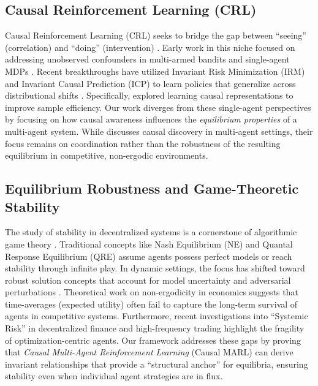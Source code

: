 \subsection{Causal Reinforcement Learning (CRL)}
Causal Reinforcement Learning (CRL) seeks to bridge the gap between ``seeing'' (correlation) and ``doing'' (intervention) \cite{bareinboim2023causal}. Early work in this niche focused on addressing unobserved confounders in multi-armed bandits and single-agent MDPs \cite{forney2017counterfactual, wang2021causal}. Recent breakthroughs have utilized Invariant Risk Minimization (IRM) \cite{arjovsky2019invariant} and Invariant Causal Prediction (ICP) \cite{peters2016causal} to learn policies that generalize across distributional shifts \cite{zhang2023invariant, lu2024robust}. Specifically, \cite{wang2023causal} explored learning causal representations to improve sample efficiency. Our work diverges from these single-agent perspectives by focusing on how causal awareness influences the \textit{equilibrium properties} of a multi-agent system. While \cite{sonntag2024causal} discusses causal discovery in multi-agent settings, their focus remains on coordination rather than the robustness of the resulting equilibrium in competitive, non-ergodic environments.

\subsection{Equilibrium Robustness and Game-Theoretic Stability}
The study of stability in decentralized systems is a cornerstone of algorithmic game theory \cite{shoham2008multiagent}. Traditional concepts like Nash Equilibrium (NE) and Quantal Response Equilibrium (QRE) assume agents possess perfect models or reach stability through infinite play. In dynamic settings, the focus has shifted toward robust solution concepts that account for model uncertainty \cite{pinto2017robust} and adversarial perturbations \cite{li2023adversarial}. Theoretical work on non-ergodicity in economics \cite{peters2019ergodicity} suggests that time-averages (expected utility) often fail to capture the long-term survival of agents in competitive systems. Furthermore, recent investigations into ``Systemic Risk'' in decentralized finance and high-frequency trading \cite{bouchaud2022complexity} highlight the fragility of optimization-centric agents. Our framework addresses these gaps by proving that \textit{Causal Multi-Agent Reinforcement Learning} (Causal MARL) can derive invariant relationships that provide a ``structural anchor'' for equilibria, ensuring stability even when individual agent strategies are in flux.


